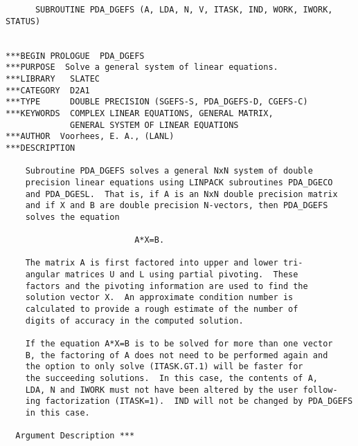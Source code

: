 

\begin{verbatim}
      SUBROUTINE PDA_DGEFS (A, LDA, N, V, ITASK, IND, WORK, IWORK, STATUS)


***BEGIN PROLOGUE  PDA_DGEFS
***PURPOSE  Solve a general system of linear equations.
***LIBRARY   SLATEC
***CATEGORY  D2A1
***TYPE      DOUBLE PRECISION (SGEFS-S, PDA_DGEFS-D, CGEFS-C)
***KEYWORDS  COMPLEX LINEAR EQUATIONS, GENERAL MATRIX,
             GENERAL SYSTEM OF LINEAR EQUATIONS
***AUTHOR  Voorhees, E. A., (LANL)
***DESCRIPTION

    Subroutine PDA_DGEFS solves a general NxN system of double
    precision linear equations using LINPACK subroutines PDA_DGECO
    and PDA_DGESL.  That is, if A is an NxN double precision matrix
    and if X and B are double precision N-vectors, then PDA_DGEFS
    solves the equation

                          A*X=B.

    The matrix A is first factored into upper and lower tri-
    angular matrices U and L using partial pivoting.  These
    factors and the pivoting information are used to find the
    solution vector X.  An approximate condition number is
    calculated to provide a rough estimate of the number of
    digits of accuracy in the computed solution.

    If the equation A*X=B is to be solved for more than one vector
    B, the factoring of A does not need to be performed again and
    the option to only solve (ITASK.GT.1) will be faster for
    the succeeding solutions.  In this case, the contents of A,
    LDA, N and IWORK must not have been altered by the user follow-
    ing factorization (ITASK=1).  IND will not be changed by PDA_DGEFS
    in this case.

  Argument Description ***


\end{verbatim}
